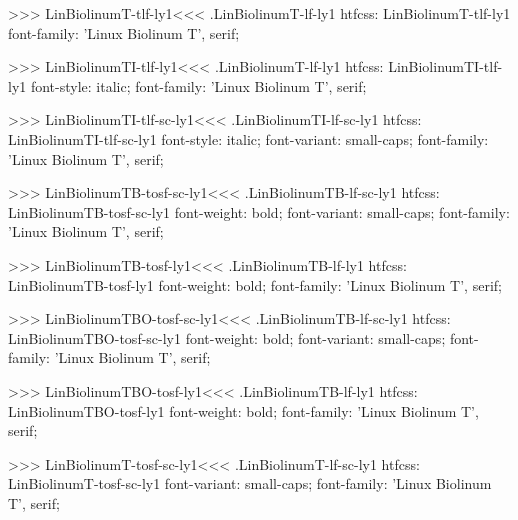 >>>
\<LinBiolinumT-tlf-ly1\><<<
.LinBiolinumT-lf-ly1
htfcss:  LinBiolinumT-tlf-ly1  font-family: 'Linux Biolinum T', serif;

>>>
\<LinBiolinumTI-tlf-ly1\><<<
.LinBiolinumT-lf-ly1
htfcss:  LinBiolinumTI-tlf-ly1  font-style: italic; font-family: 'Linux Biolinum T', serif;

>>>
\<LinBiolinumTI-tlf-sc-ly1\><<<
.LinBiolinumTI-lf-sc-ly1
htfcss:  LinBiolinumTI-tlf-sc-ly1  font-style: italic; font-variant: small-caps; font-family: 'Linux Biolinum T', serif;

>>>
\<LinBiolinumTB-tosf-sc-ly1\><<<
.LinBiolinumTB-lf-sc-ly1
htfcss:  LinBiolinumTB-tosf-sc-ly1  font-weight: bold; font-variant: small-caps; font-family: 'Linux Biolinum T', serif;

>>>
\<LinBiolinumTB-tosf-ly1\><<<
.LinBiolinumTB-lf-ly1
htfcss:  LinBiolinumTB-tosf-ly1  font-weight: bold; font-family: 'Linux Biolinum T', serif;

>>>
\<LinBiolinumTBO-tosf-sc-ly1\><<<
.LinBiolinumTB-lf-sc-ly1
htfcss:  LinBiolinumTBO-tosf-sc-ly1  font-weight: bold; font-variant: small-caps; font-family: 'Linux Biolinum T', serif;

>>>
\<LinBiolinumTBO-tosf-ly1\><<<
.LinBiolinumTB-lf-ly1
htfcss:  LinBiolinumTBO-tosf-ly1  font-weight: bold; font-family: 'Linux Biolinum T', serif;

>>>
\<LinBiolinumT-tosf-sc-ly1\><<<
.LinBiolinumT-lf-sc-ly1
htfcss:  LinBiolinumT-tosf-sc-ly1  font-variant: small-caps; font-family: 'Linux Biolinum T', serif;

